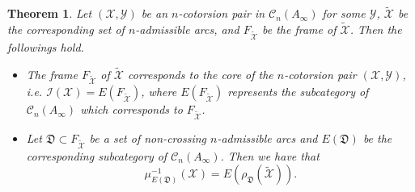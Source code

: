 \documentclass[a4paper,reqno,11pt]{amsart}
\newtheorem{theorem}{Theorem}[section]
\theoremstyle{definition}
\def\C{\mathcal{C}}
\def\X{\mathcal{X}}
\def\Y{\mathcal{Y}}
\def\I{\mathcal {I}}
\def\XX{\widetilde{\X}}
\begin{document}
\begin{theorem}\label{mainresult}
Let $(\X,\Y)$ be an $n$-cotorsion pair in $\C_n(A_{\infty})$ for some $\Y$, $\XX$ be the corresponding set of $n$-admissible arcs, and $F_{\XX}$ be the frame of $\XX$. Then the followings hold.
\begin{itemize}
  \item [\rm (1)] The frame $F_{\XX}$ of $\XX$ corresponds to the core of the $n$-cotorsion pair  $(\X,\Y)$, i.e. $\I(\X)=E(F_{\XX})$, where $E(F_{\XX})$ represents the subcategory of $\C_n(A_{\infty})$ which corresponds to $F_{\XX}$.
   \item [\rm (2)] Let $\mathfrak{D}\subset F_{\XX}$ be a set of non-crossing $n$-admissible arcs and $E(\mathfrak{D})$ be the corresponding subcategory of $\C_n(A_{\infty})$.  Then we have that
       $$\mu^{-1}_{E(\mathfrak{D})}(\X)=E(\rho_{\mathfrak{D}}(\XX)).$$
\end{itemize}
\end{theorem}
\end{document}
